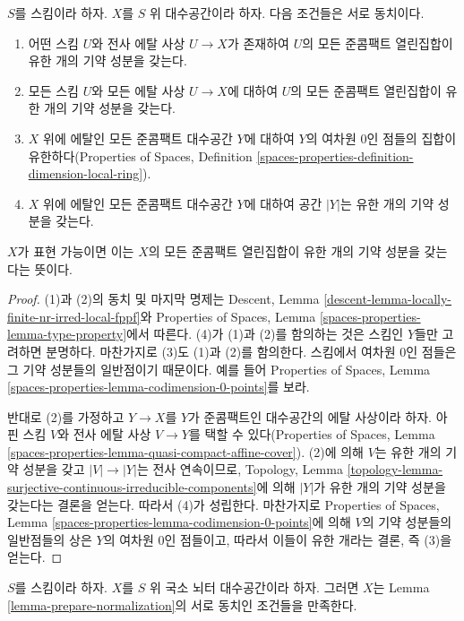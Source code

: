 \begin{lemma}
\label{lemma-prepare-normalization}
$S$를 스킴이라 하자. $X$를 $S$ 위 대수공간이라 하자.
다음 조건들은 서로 동치이다.
\begin{enumerate}
\item 어떤 스킴 $U$와 전사 에탈 사상 $U \to X$가 존재하여 $U$의 모든
준콤팩트 열린집합이 유한 개의 기약 성분을 갖는다.
\item 모든 스킴 $U$와 모든 에탈 사상 $U \to X$에 대하여 $U$의 모든
준콤팩트 열린집합이 유한 개의 기약 성분을 갖는다.
\item $X$ 위에 에탈인 모든 준콤팩트 대수공간 $Y$에 대하여 $Y$의
여차원 $0$인 점들의 집합이 유한하다(Properties of Spaces, Definition
\ref{spaces-properties-definition-dimension-local-ring}).
\item $X$ 위에 에탈인 모든 준콤팩트 대수공간 $Y$에 대하여 공간
$|Y|$는 유한 개의 기약 성분을 갖는다.
\end{enumerate}
$X$가 표현 가능이면 이는 $X$의 모든 준콤팩트 열린집합이 유한 개의
기약 성분을 갖는다는 뜻이다.
\end{lemma}

\begin{proof}
(1)과 (2)의 동치 및 마지막 명제는 Descent, Lemma
\ref{descent-lemma-locally-finite-nr-irred-local-fppf}와 Properties of
Spaces, Lemma \ref{spaces-properties-lemma-type-property}에서 따른다.
(4)가 (1)과 (2)를 함의하는 것은 스킴인 $Y$들만 고려하면 분명하다.
마찬가지로 (3)도 (1)과 (2)를 함의한다. 스킴에서 여차원 $0$인 점들은
그 기약 성분들의 일반점이기 때문이다. 예를 들어 Properties of Spaces,
Lemma \ref{spaces-properties-lemma-codimension-0-points}를 보라.

\medskip\noindent
반대로 (2)를 가정하고 $Y \to X$를 $Y$가 준콤팩트인 대수공간의 에탈
사상이라 하자. 아핀 스킴 $V$와 전사 에탈 사상 $V \to Y$를 택할 수
있다(Properties of Spaces, Lemma
\ref{spaces-properties-lemma-quasi-compact-affine-cover}). (2)에 의해
$V$는 유한 개의 기약 성분을 갖고 $|V| \to |Y|$는 전사 연속이므로,
Topology, Lemma
\ref{topology-lemma-surjective-continuous-irreducible-components}에 의해
$|Y|$가 유한 개의 기약 성분을 갖는다는 결론을 얻는다. 따라서 (4)가
성립한다. 마찬가지로 Properties of Spaces, Lemma
\ref{spaces-properties-lemma-codimension-0-points}에 의해 $V$의 기약
성분들의 일반점들의 상은 $Y$의 여차원 $0$인 점들이고, 따라서 이들이
유한 개라는 결론, 즉 (3)을 얻는다.
\end{proof}

\begin{lemma}
\label{lemma-locally-noetherian-can-be-normalized}
$S$를 스킴이라 하자. $X$를 $S$ 위 국소 뇌터 대수공간이라 하자.
그러면 $X$는 Lemma \ref{lemma-prepare-normalization}의 서로 동치인
조건들을 만족한다.
\end{lemma}


